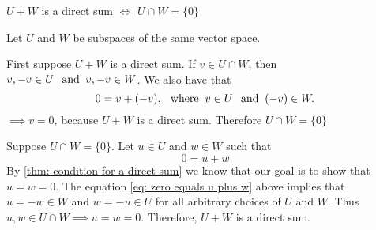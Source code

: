 \setcounter{thm}{45}
\begin{thm} 
  \label{thm: intersection of direct sum of two subscpaces}
  $U+W$ is a direct sum $\iff$ $U \cap W = \{0\}$
\end{thm}
\begin{prf} Let $U$ and $W$ be subspaces of the same vector space.
  \begin{description}
    \item{} First suppose $U+W$ is a direct sum. If $v \in U \cap W$, then $v, -v \in U \;\;\, \text{and}\;\; v, -v \in W$. We also have that
    \begin{equation}
      0 = v + (-v), \;\;\, \text{where}\;\; v\in U \;\;\, \text{and}\;\; (-v) \in W.
    \end{equation}
    $\implies v=0$, because $U+W$  is a direct sum. Therefore $U \cap W = \{0\}$

    \item{} Suppose $U\cap W = \{0\}$. Let  $u\in U$ and $w \in W$ such that
    \begin{equation}
      \label{eq: zero equals u plus w}
      0 = u+w
    \end{equation}
    By \ref{thm: condition for a direct sum} we know that our goal is to show that $u=w=0$. The equation \eqref{eq: zero equals u plus w} above implies that $u=-w\in W$  and $w=-u \in U$ for all arbitrary choices of $U$ and $W$. Thus $u,w \in U\cap W \implies u=w=0.$ Therefore, $U+W$ is a direct sum.
  \end{description}
  \vspace{-1em}
\end{prf}
